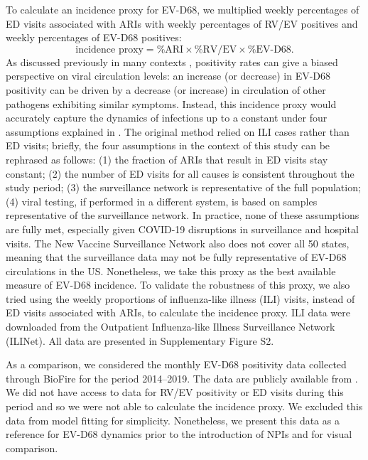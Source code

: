 \documentclass[12pt]{article}
\begin{document}
To calculate an incidence proxy for EV-D68, we multiplied weekly percentages of ED visits associated with ARIs with weekly percentages of RV/EV positives and weekly percentages of EV-D68 positives:
\begin{equation}
\textrm{incidence proxy} = \textrm{\% ARI} \times \textrm{\% RV/EV} \times \textrm{\% EV-D68}.
\end{equation}
As discussed previously in many contexts \citep{goldstein2011predicting,kissler2020projecting}, positivity rates can give a biased perspective on viral circulation levels: an increase (or decrease) in EV-D68 positivity can be driven by a decrease (or increase) in circulation of other pathogens exhibiting similar symptoms.
Instead, this incidence proxy would accurately capture the dynamics of infections up to a constant under four assumptions explained in \citep{goldstein2011predicting}.
The original method relied on ILI cases rather than ED visits; briefly, the four assumptions in the context of this study can be rephrased as follows:
(1) the fraction of ARIs that result in ED visits stay constant;
(2) the number of ED visits for all causes is consistent throughout the study period;
(3) the surveillance network is representative of the full population;
(4) viral testing, if performed in a different system, is based on samples representative of the surveillance network.
In practice, none of these assumptions are fully met, especially given COVID-19 disruptions in surveillance and hospital visits.
The New Vaccine Surveillance Network also does not cover all 50 states, meaning that the surveillance data may not be fully representative of EV-D68 circulations in the US.
Nonetheless, we take this proxy as the best available measure of EV-D68 incidence.
To validate the robustness of this proxy, we also tried using the weekly proportions of influenza-like illness (ILI) visits, instead of ED visits  associated with ARIs, to calculate the incidence proxy.
ILI data were downloaded from the Outpatient Influenza-like Illness Surveillance Network (ILINet).
All data are presented in Supplementary Figure S2.

As a comparison, we considered the monthly EV-D68 positivity data collected through BioFire for the period 2014--2019.
The data are publicly available from \cite{park2021epidemiological}.
We did not have access to data for RV/EV positivity or ED visits during this period and so we were not able to calculate the incidence proxy.
We excluded this data from model fitting for simplicity.
Nonetheless, we present this data as a reference for EV-D68 dynamics prior to the introduction of NPIs and for visual comparison.
\end{document}
